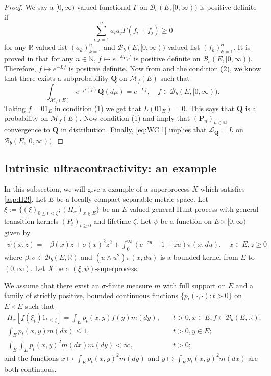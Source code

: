 \documentclass[12pt,a4paper]{amsart}
\numberwithin{equation}{section}
\theoremstyle{plain}
\theoremstyle{definition}
\theoremstyle{remark}
\begin{document}
\begin{proof}
	We say a $[0,\infty)$-valued functional $\Gamma$ on $\mathcal B_b(E,[0,\infty))$ is positive definite if
\[
\sum_{i,j =1}^n a_i a_j \Gamma (f_i + f_j)\geq 0
\]
for any $\mathbb R$-valued list $(a_k)_{k = 1}^n$ and $\mathcal B_b(E,[0,\infty))$-valued list $(f_k)_{k = 1}^n$.
	It is proved in \cite[Theorem 3.3.3]{Dawson1992Infinitely} that for any $n \in \mathbb N$, $f\mapsto e^{- \mathscr L_{\mathbf P_n}f}$ is positive definite on $\mathcal B_b(E,[0,\infty))$.
	Therefore, $f \mapsto e^{- L f}$ is positive definite.
	Now from \cite[Corollary (A.6)]{Fitzsimmons1989Construction} and the condition (2), we know that there exists a subprobability $\mathbf Q$ on $\mathcal M_f(E)$ such that
\begin{equation}	\label{eq:WC.1}
	\int_{\mathcal M_f(E)}e^{-\mu(f) } \mathbf Q(d\mu) = e^{-Lf}, \quad f \in \mathcal B_b(E,[0,\infty)).
\end{equation}
	Taking $f = 0 1_E$ in condition (1) we get that $L(0  1_E) = 0$.
	This says that $\mathbf Q$ is a probability on $\mathcal M_f(E)$.
	Now condition (1) and \cite[Theorem 1.8]{Li2011MeasureValued} imply that $(\mathbf P_n)_{n \in \mathbb N}$ convergence to $\mathbf Q$ in distribution.
	Finally, \eqref{eq:WC.1} implies that $\mathscr L_{\mathbf Q} = L$ on $\mathcal B_b(E,[0,\infty))$.
\end{proof}

\subsection{Intrinsic ultracontractivity: an example}
	In this subsection, we will give a example of a superprocess $X$ which satisfies \eqref{asp:H2!}.
	Let $E$ be a locally compact separable metric space.
	Let $\xi:= \{(\xi)_{0\leq t < \zeta}; (\Pi_x)_{x\in E}\}$ be an $E$-valued general Hunt process with general transition kernels $(P_t)_{t\geq 0}$ and lifetime $\zeta$.
	Let $\psi$ be a function on $E \times [0,\infty)$ given by
\begin{align}
	\psi(x,z)
	=- \beta(x) z + \sigma(x)^2 z^2 + \int_0^\infty (e^{-zu} -1 + zu) \pi(x,du),
	\quad x\in E, z\geq 0
\end{align}
	where $\beta, \sigma \in \mathcal B_b(E,\mathbb R)$ and $(u \wedge u^2) \pi(x,du)$ is a bounded kernel from $E$ to $(0,\infty)$.
	Let $X$ be a $(\xi, \psi)$-superprocess.

	We assume  that there exist an $\sigma$-finite measure $m$ with full support on $E$ and a family of strictly positive, bounded continuous finctions $\{p_t(\cdot,\cdot): t>0\}$ on $E\times E$ such that
\begin{align}
	\Pi_x[f(\xi_t) 1_{t< \zeta}] = \int_E p_t(x,y) f(y)m(dy), & \quad t>0, x\in E, f\in \mathcal B_b(E,\mathbb R);
	\\ \int_E p_t(x,y) m(dx) \leq 1, &\quad t>0, y\in E;
	\\ \int_E \int_E p_t(x,y)^2 m(dx)m(dy) < \infty, &\quad t>0;
\end{align}
	and the functions $x \mapsto \int_E p_t(x,y)^2m(dy)$ and $y\mapsto \int_E p_t(x,y)^2m(dx)$ are both continuous.
\end{document}
